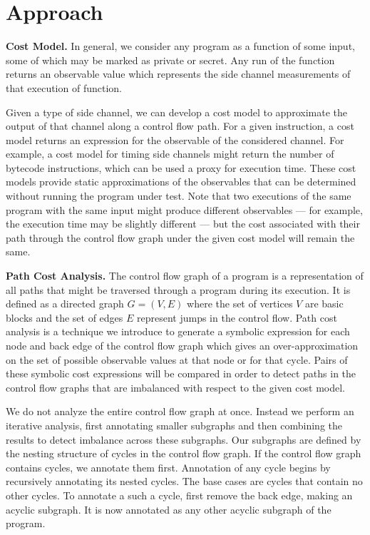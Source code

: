 \section{Approach}

\textbf{Cost Model.} In general, we consider any program as a function of some input, some of which may be marked as private or secret. Any run of the function returns an observable value which represents the side channel measurements of that execution of function. 

Given a type of side channel, we can develop a cost model to approximate the output of that channel along a control flow path. For a given instruction, a cost model returns an expression for the observable of the considered channel. For example, a cost model for timing side channels might return the number of bytecode instructions, which can be used a proxy for execution time. These cost models provide static approximations of the observables that can be determined without running the program under test. Note that two executions of the same program with the same input might produce different observables --- for example, the execution time may be slightly different --- but the cost associated with their path through the control flow graph under the given cost model will remain the same.



\textbf{Path Cost Analysis.} The control flow graph of a program is a representation of all paths that might be traversed through a program during its execution. It is defined as a directed graph $G = (V, E)$ where the set of vertices $V$ are basic blocks and the set of edges $E$ represent jumps in the control flow. Path cost analysis is a technique we introduce to generate a symbolic expression for each node and back edge of the control flow graph which gives an over-approximation on the set of possible observable values at that node or for that cycle. Pairs of these symbolic cost expressions will be compared in order to detect paths in the control flow graphs that are imbalanced with respect to the given cost model. 


We do not analyze the entire control flow graph at once. Instead we perform an iterative analysis, first annotating smaller subgraphs and then combining the results to detect imbalance across these subgraphs. Our subgraphs are defined by the nesting structure of cycles in the control flow graph. If the control flow graph contains cycles, we annotate them first. Annotation of any cycle begins by recursively annotating its nested cycles. The base cases are cycles that contain no other cycles. To annotate a such a cycle, first remove the back edge, making an acyclic subgraph. It is now annotated as any other acyclic subgraph of the program. 

